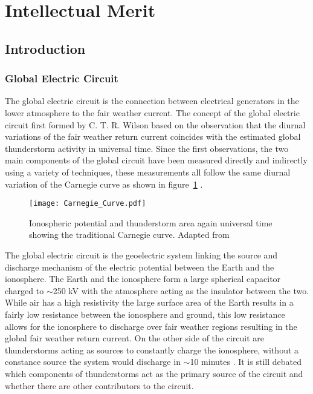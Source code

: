 \documentclass[12pt, letterpaper, onecolumn, oneside]{article}
\begin{document}
\maketitle

\section*{Intellectual Merit}
\subsection*{Introduction}

\subsubsection*{Global Electric Circuit}
The global electric circuit is the connection between electrical generators in the lower atmosphere to the fair weather current. The concept of the global electric circuit first formed by C. T. R. Wilson based on the observation that the diurnal variations of the fair weather return current coincides with the estimated global thunderstorm activity in universal time. Since the first observations, the two main components of the global circuit have been measured directly and indirectly using a variety of techniques, these measurements all follow the same diurnal variation of the Carnegie curve as shown in figure~\ref{Carnegie} \citep{Whipple1929}.

\begin{figure}[ht!]
   \centering
   \texttt{[image: Carnegie\_Curve.pdf]} 
   \caption{Ionospheric potential and thunderstorm area again universal time showing the traditional Carnegie curve. Adapted from \citet{Whipple1936}}
   \label{Carnegie}
\end{figure}

The global electric circuit is the geoelectric system linking the source and discharge mechanism of the electric potential between the Earth and the ionosphere. The Earth and the ionosphere form a large spherical capacitor charged to $\sim$250 kV with the atmosphere acting as the insulator between the two. While air has a high resistivity the large surface area of the Earth results in a fairly low resistance between the ionosphere and ground, this low resistance allows for the ionosphere to discharge over fair weather regions resulting in the global fair weather return current. On the other side of the circuit are thunderstorms acting as sources to constantly charge the ionosphere, without a constance source the system would discharge in $\sim$10 minutes \citep{Volland1984}. It is still debated which components of thunderstorms act as the primary source of the circuit and whether there are other contributors to the circuit.
\end{document}
